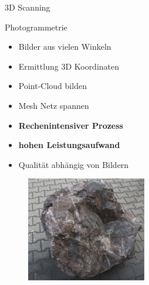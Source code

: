 \begin{frame}[m]{3D Scanning}
    \begin{minipage}{.49\textwidth}
    \begin{block}{Photogrammetrie}
        \begin{itemize}
            \item Bilder aus vielen Winkeln
            \item Ermittlung 3D Koordinaten
            \item Point-Cloud bilden
            \item Mesh Netz spannen
            \item \textbf{Rechenintensiver Prozess}
            \item \textbf{hohen Leistungsaufwand}
            \item Qualität abhängig von Bildern
        \end{itemize}
    \end{block}
    \end{minipage}    
    \begin{minipage}[m]{.49\textwidth}
        \begin{figure}[]
          \includegraphics[height=130pt]{img_niklas/rock_image.PNG}
          \label{fig:my_label}
      \end{figure}    
    \end{minipage}
    
\end{frame}


